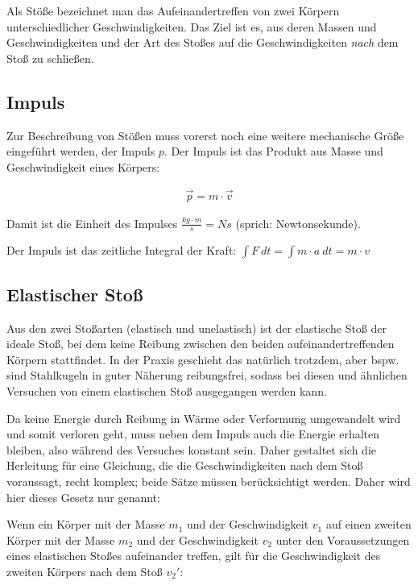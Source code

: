 Als Stöße bezeichnet man das Aufeinandertreffen von zwei Körpern unterschiedlicher Geschwindigkeiten. Das Ziel ist es, aus deren Massen und Geschwindigkeiten und der Art des Stoßes auf die Geschwindigkeiten \emph{nach} dem Stoß zu schließen.

\subsection{Impuls} \label{subsec:impuls}

Zur Beschreibung von Stößen muss vorerst noch eine weitere mechanische Größe eingeführt werden, der Impuls $p$. Der Impuls ist das Produkt aus Masse und Geschwindigkeit eines Körpers:

\begin{align}
	\vec{p} = m \cdot \vec{v}
\end{align}

\noindent Damit ist die Einheit des Impulses $\frac{kg \cdot m}{s} = Ns$ (sprich: \glqq Newtonsekunde\grqq).

\begin{NiceToKnow}
Der Impuls ist das zeitliche Integral der Kraft: $\int F \ dt = \int m \cdot a \ dt = m \cdot v$
\end{NiceToKnow}


\subsection{Elastischer Stoß}

Aus den zwei Stoßarten (elastisch und unelastisch) ist der elastische Stoß der ideale Stoß, bei dem keine Reibung zwischen den beiden aufeinandertreffenden Körpern stattfindet. In der Praxis geschieht das natürlich trotzdem, aber bspw. sind Stahlkugeln in guter Näherung reibungsfrei, sodass bei diesen und ähnlichen Versuchen von einem elastischen Stoß ausgegangen werden kann.

Da keine Energie durch Reibung in Wärme oder Verformung umgewandelt wird und somit \glqq verloren geht\grqq , muss neben dem Impuls auch die Energie erhalten bleiben, also während des Versuches konstant sein. Daher gestaltet sich die Herleitung für eine Gleichung, die die Geschwindigkeiten nach dem Stoß voraussagt, recht komplex; beide Sätze müssen berücksichtigt werden. Daher wird hier dieses Gesetz nur genannt:

Wenn ein Körper mit der Masse $m_1$ und der Geschwindigkeit $v_1$ auf einen zweiten Körper mit der Masse $m_2$ und der Geschwindigkeit $v_2$ unter den Voraussetzungen eines elastischen Stoßes aufeinander treffen, gilt für die Geschwindigkeit des zweiten Körpers nach dem Stoß $v_2'$:

